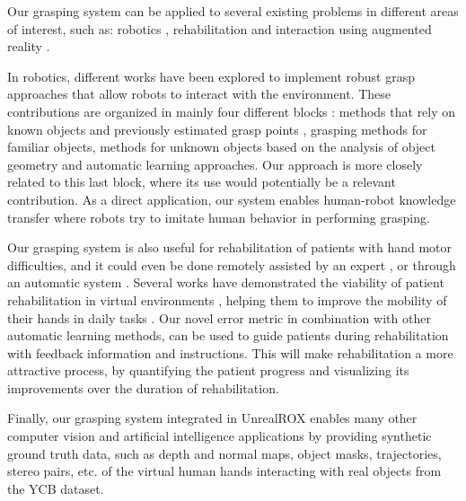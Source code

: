 Our grasping system can be applied to several existing problems in different areas of interest, such as: robotics \cite{bric2016current}, rehabilitation \cite{levin2015emergence} and interaction using augmented reality \cite{lv2015touch}.

In robotics, different works have been explored to implement robust grasp approaches that allow robots to interact with the environment. These contributions are organized in mainly four different blocks \cite{bohg2014data}: methods that rely on known objects and previously estimated grasp points  \cite{lin2015robot}, grasping methods for familiar objects\cite{vahrenkamp2016part}, methods for unknown objects based on the analysis of object geometry \cite{zapata2017using} and automatic learning approaches\cite{levine2018learning}. Our approach is more closely related to this last block, where its use would potentially be a relevant contribution. As a direct application, our system enables human-robot knowledge transfer where robots try to imitate human behavior in performing grasping.

Our grasping system is also useful for rehabilitation of patients with hand motor difficulties, and it could even be done remotely assisted by an expert \cite {escobar2018virtual}, or through an automatic system \cite{avola2018vrheab}. Several works have demonstrated the viability of patient rehabilitation in virtual environments \cite{levin2015emergence}, helping them to improve the mobility of their hands in daily tasks \cite{faria2016benefits}. Our novel error metric in combination with other automatic learning methods, can be used to guide patients during rehabilitation with feedback information and instructions. This will make rehabilitation a more attractive process, by quantifying the patient progress and visualizing its improvements over the duration of rehabilitation.

Finally, our grasping system integrated in UnrealROX \cite{martinez2019} enables many other computer vision and artificial intelligence applications by providing synthetic ground truth data, such as depth and normal maps, object masks, trajectories, stereo pairs, etc. of the virtual human hands interacting with real objects from the YCB dataset.


